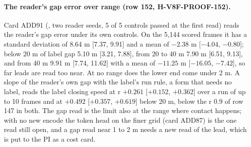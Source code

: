 \paragraph{The reader's gap error over range (row 152, H-V8F-PROOF-152).} Card ADD91 (, two reader seeds, 5 of 5 controls passed at the first read) reads the reader's gap error under its own controls. On the 5,144 scored frames it has a standard deviation of 8.64 m [7.37, 9.91] and a mean of $-2.38$ m [$-4.04$, $-0.80$]; below 20 m of label gap 5.10 m [3.21, 7.88], from 20 to 40 m 7.90 m [6.51, 9.13], and from 40 m 9.91 m [7.74, 11.62] with a mean of $-11.25$ m [$-16.05$, $-7.42$], so far leads are read too near. At no range does the lower end come under 2 m. A slope of the reader's own gap with the label's run rule, a form that needs no label, reads the label closing speed at r $+0.261$ [$+0.152$, $+0.362$] over a run of up to 10 frames and at $+0.492$ [$+0.357$, $+0.619$] below 20 m, below the r 0.9 of row 147 in both. The gap read is the limit also at the range where contact happens; with no new encode the token head on the finer grid (card ADD87) is the one read still open, and a gap read near 1 to 2 m needs a new read of the lead, which is put to the PI as a cost card.
